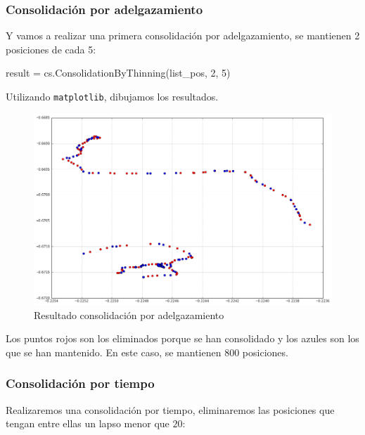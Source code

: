 \documentclass[a4paper, 12pt]{article}
\begin{document}
\pagebreak
\subsubsection{Consolidaci\'on por adelgazamiento}

Y vamos a realizar una primera consolidaci\'on por adelgazamiento, se mantienen 2 posiciones de cada 5:\\

\begin{python}
result = cs.ConsolidationByThinning(list_pos, 2, 5)
\end{python}

\bigskip

Utilizando \texttt{matplotlib}, dibujamos los resultados.\\

\begin{figure}[H]
	\includegraphics[scale=.45]{../comparativa/thinningSuj1.png}
	\caption{Resultado consolidaci\'on por adelgazamiento}
\end{figure}

Los puntos rojos son los eliminados porque se han consolidado y los azules son los que se han mantenido. En este caso, se mantienen 800 posiciones. \\

\pagebreak
\subsubsection{Consolidaci\'on por tiempo}

Realizaremos una consolidaci\'on por tiempo, eliminaremos las posiciones que tengan entre ellas un lapso menor que $20$:\\
\end{document}
